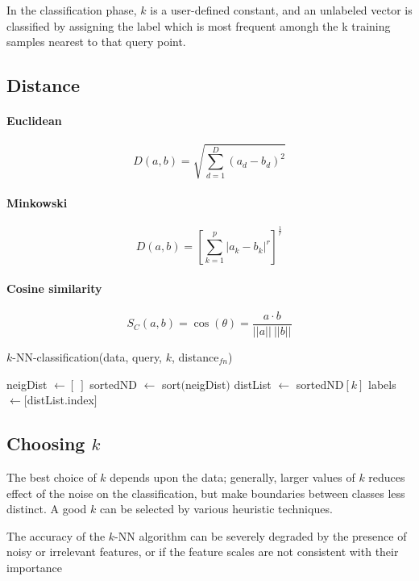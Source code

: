 \documentclass[a4paper,6pt,twocolumn,fleqn]{article}
\begin{document}
In the classification phase, \(k\) is a user-defined constant, and an unlabeled vector
is classified by assigning the label which is most frequent amongh the k training samples nearest to that query point.

\subsection{Distance}
\paragraph{Euclidean}
\begin{equation}
    D(a,b) = \sqrt{\sum_{d=1}^D \left(a_d - b_d\right)^2}
\end{equation}
\paragraph{Minkowski}
\begin{equation}
    D(a,b) = \left[\sum_{k=1}^p |a_k - b_k|^r\right]^{\frac 1 r}
\end{equation}
\paragraph{Cosine similarity}
\begin{equation}
    S_C (a,b) = \cos(\theta) = \frac {a \cdot b} {||a||\ ||b||}
\end{equation}
\begin{algorithm}
    \caption{$k$-NN-classification(data, query, $k$, distance$_{fn}$)}
    neigDist $\gets [\ ]$\;
    sortedND $\gets$ sort$($neigDist$)$\;
    distList $\gets$ sortedND$[k]$\;
    labels $\gets [$distList.index$]$\;
\end{algorithm}
\subsection{Choosing \(k\)}
The best choice of \(k\) depends upon the data; generally, larger values of \(k\) reduces effect of the noise on the classification, but make boundaries between classes less distinct. A good \(k\) can be selected by various heuristic techniques.

The accuracy of the \(k\)-NN algorithm can be severely degraded by the presence of noisy or irrelevant features, or if the feature scales are not consistent with their importance
\end{document}
